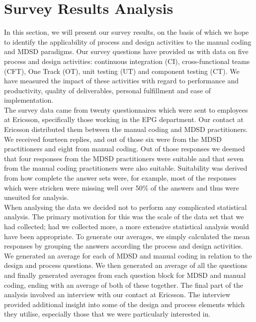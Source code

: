 \documentclass[final_report_innit.tex]{subfiles}
\begin{document}
\section{Survey Results Analysis}

In this section, we will present our survey results, on the basis of which we hope to identify the applicability of process and design activities to the manual coding and MDSD paradigms. Our survey questions have provided us with data on five process and design activities: continuous integration (CI), cross-functional teams (CFT), One Track (OT), unit testing (UT) and component testing (CT). We have measured the impact of these activities with regard to performance and productivity, quality of deliverables, personal fulfillment and ease of implementation.
\\

The survey data came from twenty questionnaires which were sent to employees at Ericsson, specifically those working in the EPG department. Our contact at Ericsson distributed them between the manual coding and MDSD practitioners. We received fourteen replies, and out of those six were from the MDSD practitioners and eight from manual coding. Out of those responses we deemed that four responses from the MDSD practitioners were suitable and that seven from the manual coding practitioners were also suitable. Suitability was derived from how complete the answer sets were, for example, most of the responses which were stricken were missing well over 50\% of the answers and thus were unsuited for analysis.
\\

When analysing the data we decided not to perform any complicated statistical analysis. The primary motivation for this was the scale of the data set that we had collected; had we collected more, a more extensive statistical analysis would have been appropriate. To generate our averages, we simply calculated the mean responses by grouping the answers according the process and design activities. We generated an average for each of MDSD and manual coding in relation to the design and process questions. We then generated an average of all the questions and finally generated averages from each question block for MDSD and manual coding, ending with an average of both of these together. The final part of the analysis involved an interview with our contact at Ericsson. The interview provided additional insight into some of the design and process elements which they utilise, especially those that we were particularly interested in.
\\
\end{document}
